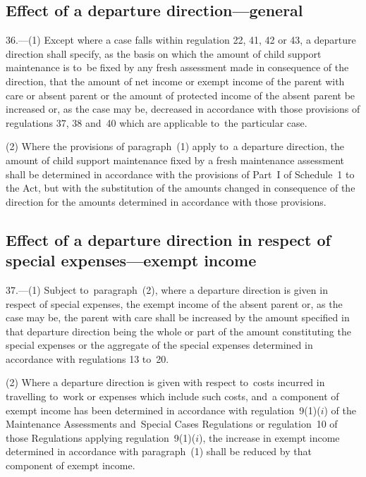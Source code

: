 \documentclass[12pt,a4paper]{article}
\begin{document}
\subsection[36. Effect of a
departure direction—general]{Effect of a
departure direction—general}

36.—(1) Except where a case falls within regulation
22, 41, 42 or 43, a departure direction shall specify, as the basis on which the
amount of child support maintenance is to~be fixed by any fresh assessment made
in consequence of the direction, that the amount of net income or exempt income
of the parent with care or absent parent or the amount of protected income of
the absent parent be increased or, as the case may be, decreased in accordance
with those provisions of regulations 37, 38 and~40 which are applicable to~the
particular case.

(2) Where the provisions of paragraph~(1) apply to~a departure direction, the
amount of child support maintenance fixed by a fresh maintenance assessment
shall be determined in accordance with the provisions of Part~I of Schedule~1 to
the Act, but with the substitution of the amounts changed in consequence of the
direction for the amounts determined in accordance with those provisions.

\subsection[37. Effect of a departure direction in respect of special expenses—\hspace{0pt}exempt
income]{\sloppy Effect of a departure direction in respect of special expenses—\hspace{0pt}exempt
income}

37.—(1) Subject to~paragraph~(2), where a departure direction is given in respect of special expenses, the exempt income of the absent parent or, as the case may be, the parent with care shall be increased by 
the amount specified in that departure direction being the whole or part of  %
the amount constituting the special expenses or the aggregate of the special expenses determined in accordance with regulations 13 to~20.

(2) Where a departure direction is given with respect to~costs incurred in
travelling to~work or expenses which include such costs, and~a component of
exempt income has been determined in accordance with regulation~9(1)($i$) of the
Maintenance Assessments and~Special Cases Regulations or regulation~10 of those
Regulations applying regulation~9(1)($i$), the increase in exempt income
determined in accordance with paragraph~(1) shall be reduced by that component
of exempt income.%
\end{document}
